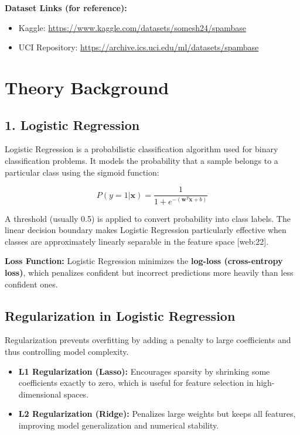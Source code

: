 \documentclass[11pt]{article}
\begin{document}
\textbf{Dataset Links (for reference):}
\begin{itemize}
\item Kaggle: \href{https://www.kaggle.com/datasets/somesh24/spambase}{https://www.kaggle.com/datasets/somesh24/spambase}
\item UCI Repository: \href{https://archive.ics.uci.edu/ml/datasets/spambase}{https://archive.ics.uci.edu/ml/datasets/spambase}
\end{itemize}

\section*{Theory Background}

\subsection*{1. Logistic Regression}
Logistic Regression is a probabilistic classification algorithm used for binary classification problems. It models the probability that a sample belongs to a particular class using the sigmoid function:

\[
P(y=1|\mathbf{x}) = \frac{1}{1 + e^{-(\mathbf{w}^T\mathbf{x} + b)}}
\]

A threshold (usually 0.5) is applied to convert probability into class labels. The linear decision boundary makes Logistic Regression particularly effective when classes are approximately linearly separable in the feature space [web:22].

\textbf{Loss Function:}
Logistic Regression minimizes the \textbf{log-loss (cross-entropy loss)}, which penalizes confident but incorrect predictions more heavily than less confident ones.

\subsection*{Regularization in Logistic Regression}
Regularization prevents overfitting by adding a penalty to large coefficients and thus controlling model complexity.

\begin{itemize}
\item \textbf{L1 Regularization (Lasso):}
Encourages sparsity by shrinking some coefficients exactly to zero, which is useful for feature selection in high-dimensional spaces.

\item \textbf{L2 Regularization (Ridge):}
Penalizes large weights but keeps all features, improving model generalization and numerical stability.
\end{itemize}
\end{document}
